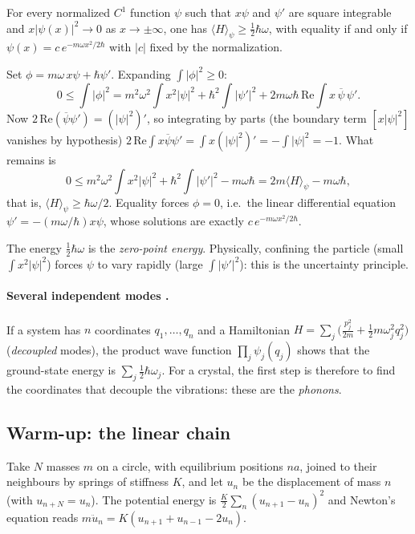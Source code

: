 \begin{proposition}\label{ch3:prop:osc}
For every normalized $C^1$ function $\psi$ such that $x\psi$ and $\psi'$ are square integrable and
$x|\psi(x)|^2\to0$ as $x\to\pm\infty$, one has $\langle H\rangle_\psi\ge\tfrac12\hbar\omega$, with equality if and only if
$\psi(x)=c\,e^{-m\omega x^2/2\hbar}$ with $|c|$ fixed by the normalization. \tierC
\end{proposition}
\begin{humanproof}
Set $\phi=m\omega\,x\psi+\hbar\psi'$. Expanding $\int|\phi|^2\ge0$:
\[
0\le\int|\phi|^2=m^2\omega^2\!\int x^2|\psi|^2+\hbar^2\!\int|\psi'|^2+2m\omega\hbar\,\mathrm{Re}\!\int x\,\overline{\psi}\,\psi' .
\]
Now $2\,\mathrm{Re}(\overline\psi\psi')=(|\psi|^2)'$, so integrating by parts (the boundary term
$[x|\psi|^2]$ vanishes by hypothesis)
$2\,\mathrm{Re}\int x\overline\psi\psi'=\int x(|\psi|^2)'=-\int|\psi|^2=-1$. What remains is
\[
0\le m^2\omega^2\!\int x^2|\psi|^2+\hbar^2\!\int|\psi'|^2-m\omega\hbar=2m\langle H\rangle_\psi-m\omega\hbar ,
\]
that is, $\langle H\rangle_\psi\ge\hbar\omega/2$. Equality forces $\phi=0$, i.e.\ the linear differential equation
$\psi'=-(m\omega/\hbar)x\psi$, whose solutions are exactly $c\,e^{-m\omega x^2/2\hbar}$.
\end{humanproof}
\noindent The energy $\tfrac12\hbar\omega$ is the \emph{zero-point energy}. Physically, confining the particle
(small $\int x^2|\psi|^2$) forces $\psi$ to vary rapidly (large $\int|\psi'|^2$): this is the uncertainty principle.

\paragraph{Several independent modes \tierC.} If a system has $n$ coordinates $q_1,\dots,q_n$ and a Hamiltonian
$H=\sum_j\bigl(\tfrac{p_j^2}{2m}+\tfrac12m\omega_j^2q_j^2\bigr)$ (\emph{decoupled} modes), the product wave function
$\prod_j\psi_j(q_j)$ shows that the ground-state energy is $\sum_j\tfrac12\hbar\omega_j$. For a crystal, the first
step is therefore to find the coordinates that decouple the vibrations: these are the \emph{phonons}.

\subsection{Warm-up: the linear chain}\label{ch3:sec:chaine}
Take $N$ masses $m$ on a circle, with equilibrium positions $na$, joined to their neighbours by springs of stiffness
$K$, and let $u_n$ be the displacement of mass $n$ (with $u_{n+N}=u_n$). The potential energy is
$\tfrac K2\sum_n(u_{n+1}-u_n)^2$ and Newton's equation reads $m\ddot u_n=K(u_{n+1}+u_{n-1}-2u_n)$.

